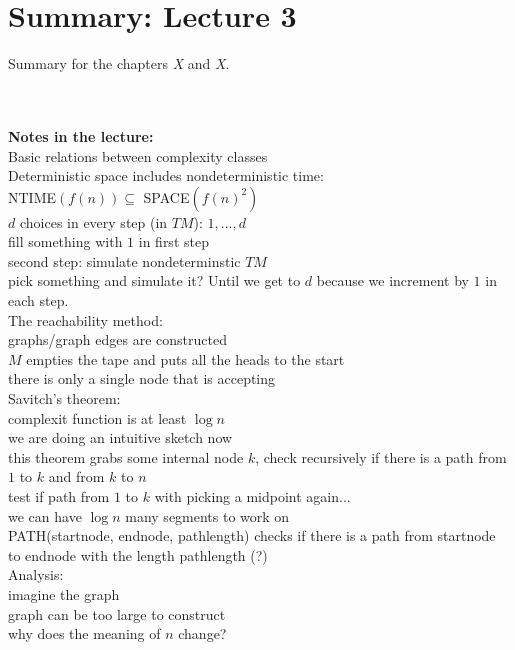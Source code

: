 \documentclass[a4]{scrartcl}
\begin{document}




\section*{Summary: Lecture 3}

Summary for the chapters \textit{X} and \textit{X}. \cite{book}





\ \\
\\
\textbf{Notes in the lecture:} \\

Basic relations between complexity classes \\

Deterministic space includes nondeterministic time: \\
NTIME$(f(n)) \subseteq$ SPACE$(f(n)^2)$ \\
$d$ choices in every step (in $TM$): $1,...,d$ \\
fill something with $1$ in first step \\
second step: simulate nondeterminstic $TM$ \\
pick something and simulate it? %
Until we get to $d$ because we increment by $1$ in each step. \\

The reachability method: \\
graphs/graph edges are constructed \\
$M$ empties the tape and puts all the heads to the start \\
there is only a single node that is accepting \\

Savitch's theorem: \\
complexit function is at least $\log n$ \\
we are doing an intuitive sketch now \\
this theorem grabs some internal node $k$, check recursively if there is a path from $1$ to $k$ and from $k$ to $n$ \\
test if path from $1$ to $k$ with picking a midpoint again... \\
we can have $\log n$ many segments to work on \\
PATH(startnode, endnode, pathlength) checks if there is a path from startnode to endnode with the length pathlength (?) \\

Analysis: \\
imagine the graph \\
graph can be too large to construct \\
why does the meaning of $n$ change?














\newpage

\printbibliography
\end{document}
